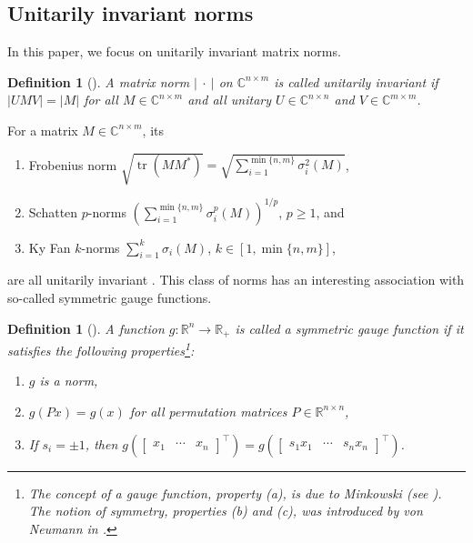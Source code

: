 \documentclass[pdflatex,sn-mathphys-num]{sn-jnl}%
\DeclareMathOperator{\tr}{tr}
\newcommand{\norm}[1]{\left|#1\right|}
\theoremstyle{thmstyleone}
\newtheorem{definition}[theorem]{Definition}
\begin{document}
\subsection{Unitarily invariant norms}

In this paper, we focus on unitarily invariant matrix norms.

\begin{definition}[{\cite[p. 835]{bernstein2018scalar}}]
A matrix norm $\norm{\ \cdot\ }$ on $\mathbb{C}^{n\times m}$ is called \emph{unitarily invariant} if $\norm{UMV}=\norm{M}$ for all $M\in\mathbb{C}^{n\times m}$ and all unitary $U\in\mathbb{C}^{n\times n}$ and $V\in\mathbb{C}^{m\times m}$.
\end{definition}

For a matrix $M\in\mathbb{C}^{n\times m}$, its
\begin{enumerate}[label=-]
    \item Frobenius norm $\sqrt{\tr(MM^*)}=\sqrt{\sum_{i=1}^{\min\{n,m\}}\sigma_i^2(M)}$,
    \item Schatten $p$-norms $(\sum_{i=1}^{\min\{n,m\}}\sigma_i^p(M))^{1/p}$, $p\geq1$, and
    \item Ky Fan $k$-norms $\sum_{i=1}^k\sigma_i(M)$, $k\in[1,\min\{n,m\}]$,
\end{enumerate}
are all unitarily invariant \cite[p. 92]{bhatia2013matrix}. This class of norms has an interesting association with so-called symmetric gauge functions. 

\begin{definition}[{\cite[p. 51]{mirsky1960symmetric}}]
A function $g:\mathbb{R}^n\rightarrow \mathbb{R}_+$ is called a \emph{symmetric gauge function} if it satisfies the following properties\footnote{The concept of a gauge function, property (a), is due to Minkowski (see \cite[1.1(d)]{phelps1993convex}). The notion of symmetry, properties (b) and (c), was introduced by von Neumann in \cite{von1937some}.}:
\begin{enumerate}[label=\normalfont{(\alph*)}]
    \item $g$ is a norm, 
    \item $g(Px)=g(x)$ for all permutation matrices $P\in\mathbb{R}^{n\times n}$,
    \item If $s_i=\pm 1$, then $g(\begin{bmatrix}
    x_1 & \cdots & x_n
    \end{bmatrix}^\top)=g(\begin{bmatrix}
    s_1x_1 & \cdots & s_nx_n
    \end{bmatrix}^\top)$.
\end{enumerate}
\end{definition}
\end{document}
